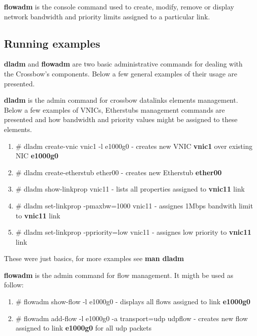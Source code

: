 \documentclass[11pt]{book}
\begin{document}
                        \medskip

                        \textbf{flowadm} is the console command used to create, modify, remove or display network bandwidth and priority limits assigned to a particular link. 


                \subsection{Running examples}

                        \textbf{dladm} and \textbf{flowadm} are two basic administrative commands for dealing with the Crossbow's components. Below a few general examples of their usage are presented.

                        \textbf{dladm} is the admin command for crossbow datalinks elements management. Below a few examples of VNICs, Etherstubs management commands are presented and how
                        bandwidth and priority values might be assigned to these elements.

                        \begin{enumerate}
                        	\item{\# dladm create-vnic vnic1 -l e1000g0 - creates new VNIC \textbf{vnic1} over existing NIC \textbf{e1000g0}}
        	                \item{\# dladm create-etherstub ether00 - creates new Etherstub \textbf{ether00}}
                        	\item{\# dladm show-linkprop vnic11 - lists all properties assigned to \textbf{vnic11} link}
                        	\item{\# dladm set-linkprop -pmaxbw=1000 vnic11 - assignes 1Mbps bandwith limit to \textbf{vnic11} link}
                        	\item{\# dladm set-linkprop -ppriority=low vnic11 - assignes low priority to \textbf{vnic11} link}
                        \end{enumerate}

                        These were just basics, for more examples see \textbf{man dladm}

                        \medskip
        
                        \textbf{flowadm} is the admin command for flow management. It migth be used as follow:     

                        \begin{enumerate}
                                \item{\# flowadm show-flow -l e1000g0 - displays all flows assigned to link \textbf{e1000g0}}
                                \item{\# flowadm add-flow -l e1000g0 -a transport=udp udpflow - creates new flow assigned to link \textbf{e1000g0} for all udp packets}
                        \end{enumerate}
\end{document}

